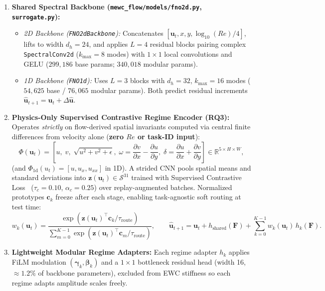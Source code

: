 \documentclass[11pt,a4paper]{article}
\begin{document}
\begin{enumerate}
  \item \textbf{Shared Spectral Backbone (\texttt{mewc\_flow/models/fno2d.py}, \texttt{surrogate.py}):}
  \begin{itemize}
    \item \emph{2D Backbone (\texttt{FNO2dBackbone}):} Concatenates $[\mathbf{u}_t, x, y, \log_{10}(Re)/4]$, lifts to width $d_h = 24$, and applies $L=4$ residual blocks pairing complex \texttt{SpectralConv2d} ($k_{\max}=8$ modes) with $1\times 1$ local convolutions and GELU ($299{,}186$ base params; $340{,}018$ modular params).
    \item \emph{1D Backbone (\texttt{FNO1d}):} Uses $L=3$ blocks with $d_h=32$, $k_{\max}=16$ modes ($54{,}625$ base / $76{,}065$ modular params). Both predict residual increments $\hat{\mathbf{u}}_{t+1} = \mathbf{u}_t + \Delta\hat{\mathbf{u}}$.
  \end{itemize}

  \item \textbf{Physics-Only Supervised Contrastive Regime Encoder (RQ3):} Operates \emph{strictly} on flow-derived spatial invariants computed via central finite differences from velocity alone (\textbf{zero $Re$ or task-ID input}):
  \begin{equation}
  \Phi(\mathbf{u}_t) = \left[u, \; v, \; \sqrt{u^2 + v^2 + \epsilon}, \; \omega = \frac{\partial v}{\partial x} - \frac{\partial u}{\partial y}, \; \delta = \frac{\partial u}{\partial x} + \frac{\partial v}{\partial y}\right] \in \mathbb{R}^{5 \times H \times W},
  \end{equation}
  (and $\Phi_{1\text{d}}(u_t) = [u, u_x, u_{xx}]$ in 1D). A strided CNN pools spatial means and standard deviations into $\mathbf{z}(\mathbf{u}_t) \in \mathcal{S}^{31}$ trained with Supervised Contrastive Loss~\cite{khosla2020supcon} ($\tau_c = 0.10$, $\alpha_c = 0.25$) over replay-augmented batches. Normalized prototypes $\mathbf{c}_k$ freeze after each stage, enabling task-agnostic soft routing at test time:
  \begin{equation}
  w_k(\mathbf{u}_t) = \frac{\exp(\mathbf{z}(\mathbf{u}_t)^{\top} \mathbf{c}_k / \tau_{\text{route}})}{\sum_{m=0}^{K-1} \exp(\mathbf{z}(\mathbf{u}_t)^{\top} \mathbf{c}_m / \tau_{\text{route}})}, \qquad \hat{\mathbf{u}}_{t+1} = \mathbf{u}_t + h_{\text{shared}}(\mathbf{F}) + \sum_{k=0}^{K-1} w_k(\mathbf{u}_t)\, h_k(\mathbf{F}).
  \end{equation}

  \item \textbf{Lightweight Modular Regime Adapters:} Each regime adapter $h_k$ applies FiLM modulation $(\boldsymbol{\gamma}_k, \boldsymbol{\beta}_k)$ and a $1\times 1$ bottleneck residual head (width 16, $\approx 1.2\%$ of backbone parameters), excluded from EWC stiffness so each regime adapts amplitude scales freely.


\end{enumerate}
\end{document}
